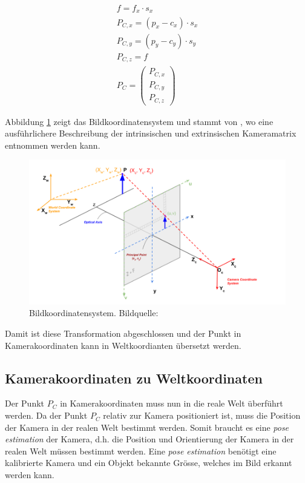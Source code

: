 \begin{align}
f = f_x \cdot s_x\\
P_{C,x} = (p_x - c_x) \cdot s_x\\
P_{C,y} = (p_y - c_y) \cdot s_y\\
P_{C,z} = f\\
P_C = \begin{pmatrix}P_{C,x}\\P_{C,y}\\P_{C,z}\end{pmatrix}
\end{align}

Abbildung \ref{fig:camera_projection_learnopencv} zeigt das Bildkoordinatensystem und stammt
von \cite{learnopencv:geometry_of_image_formation},
wo eine ausführlichere Beschreibung der intrinsischen und extrinsischen Kameramatrix entnommen werden kann.

\begin{figure}[h!]
    \includegraphics[width=0.8\linewidth]{../common/resources/coordinate_systems/camera_projection_learnopencv.png}
    \caption{Bildkoordinatensystem. Bildquelle: \cite{learnopencv:geometry_of_image_formation}}
    \label{fig:camera_projection_learnopencv}
\end{figure}

Damit ist diese Transformation abgeschlossen und der Punkt in Kamerakoordinaten kann in Weltkoordianten übersetzt werden.

\subsection{Kamerakoordinaten zu Weltkoordinaten}\label{kap:camera_to_world}

Der Punkt $P_C$ in Kamerakoordinaten muss nun in die reale Welt überführt werden. Da der Punkt $P_C$ relativ zur Kamera
positioniert ist, muss die Position der Kamera in der realen Welt bestimmt werden.
Somit braucht es eine \emph{pose estimation} der Kamera, d.h. die Position und Orientierung der Kamera in der realen Welt müssen bestimmt werden.
Eine \emph{pose estimation} benötigt eine kalibrierte Kamera und ein Objekt bekannte Grösse, welches im Bild erkannt werden kann.

